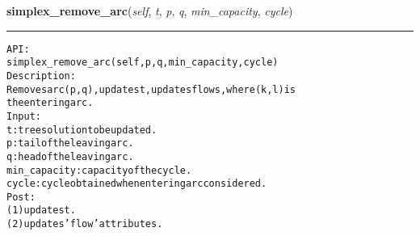     \label{coinor:gimpy:graph:Graph:simplex_remove_arc}

    \vspace{0.5ex}

\hspace{.8\funcindent}\begin{boxedminipage}{\funcwidth}

    \raggedright \textbf{simplex\_remove\_arc}(\textit{self}, \textit{t}, \textit{p}, \textit{q}, \textit{min\_capacity}, \textit{cycle})

    \vspace{-1.5ex}

    \rule{\textwidth}{0.5\fboxrule}
\setlength{\parskip}{2ex}
\begin{alltt}

API:
    simplex\_remove\_arc(self, p, q, min\_capacity, cycle)
Description:
    Removes arc (p,q), updates t, updates flows, where (k,l) is
    the entering arc.
Input:
    t: tree solution to be updated.
    p: tail of the leaving arc.
    q: head of the leaving arc.
    min\_capacity: capacity of the cycle.
    cycle: cycle obtained when entering arc considered.
Post:
    (1) updates t.
    (2) updates 'flow' attributes.
\end{alltt}

\setlength{\parskip}{1ex}
    \end{boxedminipage}

    \label{coinor:gimpy:graph:Graph:simplex_search}

    \vspace{0.5ex}

